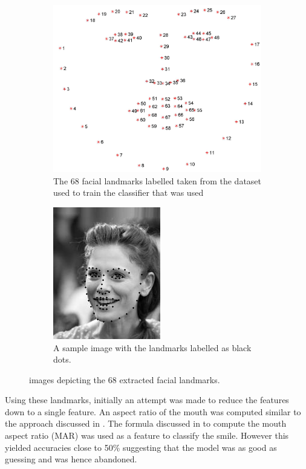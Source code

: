 \documentclass{article}
\begin{document}
 		\begin{figure}[htb]
 			\centering
 			\begin{subfigure}{0.2\textwidth}
 				\centering
 				\includegraphics[scale=0.05]{68_landmarks.jpg}
 				\caption{The 68 facial landmarks labelled taken from the dataset used to train the classifier that was used \autocite{ibug_dataset}}
 				\label{fig:68_landmarks}	
 			\end{subfigure}
 			\hspace{1em}
 			\begin{subfigure}{0.2\textwidth}
 				\centering
 				\includegraphics[scale=0.5]{68_landmark_sample.png}
 				\caption{A sample image with the landmarks labelled as black dots.}
 				\label{fig:68_landmark_sample}	
 			\end{subfigure}
 			\caption{images depicting the 68 extracted facial landmarks.}
 			\label{fig:68_landmarks_all}
 		\end{figure}
 		
 		Using these landmarks, initially an attempt was made to reduce the features down to a single feature. An aspect ratio of the mouth was computed similar to the approach discussed in \autocite{soukupova2016}. The formula discussed in \autocite{8751886} to compute the mouth aspect ratio (MAR) was used as a feature to classify the smile. However this yielded accuracies close to 50\% suggesting that the model was as good as guessing and was hence abandoned. 
 		\\
 		
\end{document}
